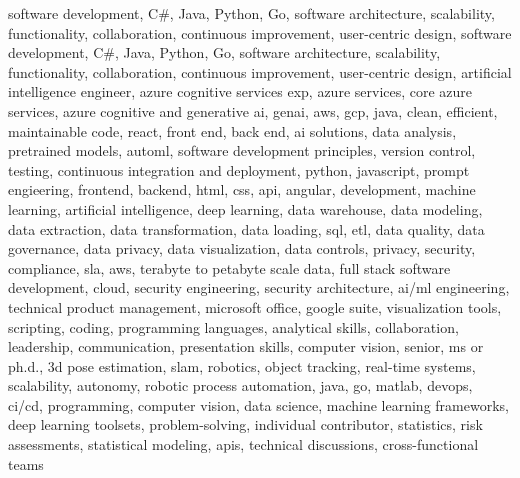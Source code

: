 \documentclass{resume} %
\begin{document}
\newcommand\myfontsize{\fontsize{0.1pt}{0.1pt}\selectfont} \myfontsize \color{white}
software development, C\#, Java, Python, Go, software architecture, scalability, functionality, collaboration, continuous improvement, user{-}centric design, software development, C\#, Java, Python, Go, software architecture, scalability, functionality, collaboration, continuous improvement, user{-}centric design, {artificial intelligence engineer, azure cognitive services exp, azure services, core azure services, azure cognitive and generative ai, genai, aws,  gcp, java, clean, efficient, maintainable code, react, front end, back end, ai solutions, data analysis, pretrained models, automl, software development principles, version control, testing, continuous integration and deployment, python, javascript, prompt engieering, frontend, backend, html, css, api, angular, development, machine learning, artificial intelligence, deep learning, data warehouse, data modeling, data extraction, data transformation, data loading, sql, etl, data quality, data governance, data privacy, data visualization, data controls, privacy, security, compliance, sla, aws, terabyte to petabyte scale data, full stack software development, cloud, security engineering, security architecture, ai/ml engineering, technical product management, microsoft office, google suite, visualization tools, scripting, coding, programming languages, analytical skills, collaboration, leadership, communication, presentation skills, computer vision, senior, ms or ph.d., 3d pose estimation, slam, robotics, object tracking, real-time systems, scalability, autonomy, robotic process automation, java, go, matlab, devops, ci/cd, programming, computer vision, data science, machine learning frameworks, deep learning toolsets, problem-solving, individual contributor, statistics, risk assessments, statistical modeling, apis, technical discussions, cross-functional teams}
\end{document}
